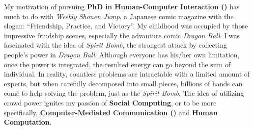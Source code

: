\noindent 
My motivation of pursuing \textbf{PhD in Human-Computer Interaction ()}
has much to do with \textit{Weekly Sh\={o}nen Jump}, a Japanese comic magazine with the slogan: ``Friendship, Practice, and Victory''.
My childhood was occupied by those impressive frindship scenes, especially the advanture comic \textit{Dragon Ball}.
I was fascinated with the idea of \textit{Spirit Bomb}, 
the strongest attack by collecting people's power in \textit{Dragon Ball}.
Although everyone has his/her own limitation, once the power is integrated, 
the resulted energy can go beyond the sum of individual.
In reality, countless problems are intractable with a limited amount of experts,
but when carefully decomposed into small pieces, billions of hands can come to help solving the problem, 
just as the \textit{Spirit Bomb}.
The idea of utilizing crowd power ignites my passion of \textbf{Social Computing},
or to be more specifically, \textbf{Computer-Mediated Communication ()} and \textbf{Human Computation}. \\



